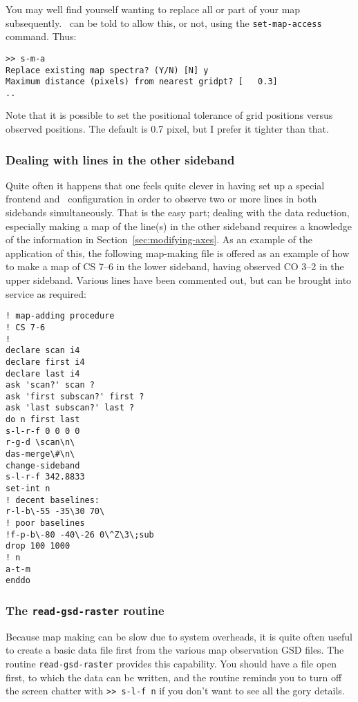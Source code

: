 You may well find yourself wanting to replace all or part of your map
subsequently. \SPECX\ can be told to allow this, or not, using the
{\tt set-map-access} command. Thus:
\begin{verbatim}
>> s-m-a
Replace existing map spectra? (Y/N) [N] y
Maximum distance (pixels) from nearest gridpt? [   0.3]
..
\end{verbatim}
Note that it is possible to set the positional tolerance of grid
positions versus observed positions. The default is 0.7 pixel, but I
prefer it tighter than that.

\subsubsection{Dealing with lines in the other sideband}
\label{sec:other-sideband-maps}
Quite often it happens that one feels quite clever in having set up a
special frontend and \das\ configuration in order to observe two or
more lines in both sidebands simultaneously. That is the easy part;
dealing with the data reduction, especially making a map of the
line(s) in the other sideband requires a knowledge of the information
in Section~\ref{sec:modifying-axes}. As an example of the application
of this, the following map-making file is offered as an example of how
to make a map of CS 7--6 in the lower sideband, having observed CO
3--2 in the upper sideband. Various lines have been commented out, but
can be brought into service as required:
\begin{verbatim}
! map-adding procedure
! CS 7-6 
! 
declare scan i4
declare first i4
declare last i4
ask 'scan?' scan ?
ask 'first subscan?' first ?
ask 'last subscan?' last ?
do n first last
s-l-r-f 0 0 0 0
r-g-d \scan\n\
das-merge\#\n\
change-sideband
s-l-r-f 342.8833
set-int n
! decent baselines:
r-l-b\-55 -35\30 70\
! poor baselines
!f-p-b\-80 -40\-26 0\^Z\3\;sub
drop 100 1000
! n
a-t-m
enddo
\end{verbatim} 

\subsubsection{The {\tt read-gsd-raster} routine}
\label{sec:r-g-r}
Because map making can be slow due to system overheads, it is quite
often useful to create a basic data file first from the various map
observation GSD files. The routine {\tt read-gsd-raster} provides this
capability. You should have a file open first, to which the data can 
be written, and the routine reminds you to turn off the screen chatter
with \verb|>> s-l-f n| if you don't want to see all the gory details.

